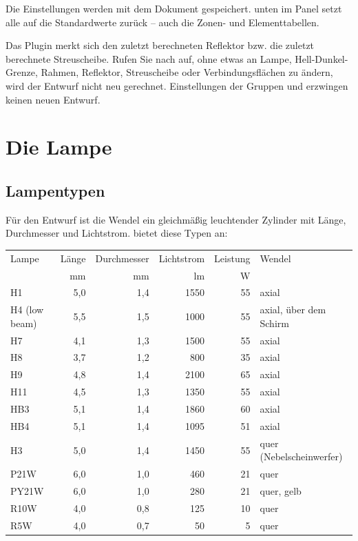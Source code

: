 Die Einstellungen werden mit dem Dokument gespeichert.  unten im Panel setzt
alle auf die Standardwerte zurück -- auch die Zonen- und Elementtabellen.

\begin{tipp}
Das Plugin merkt sich den zuletzt berechneten Reflektor bzw. die zuletzt berechnete Streuscheibe.
Rufen Sie nach   auf, ohne etwas an Lampe,
Hell-Dunkel-Grenze, Rahmen, Reflektor, Streuscheibe oder Verbindungsflächen zu ändern, wird der
Entwurf nicht neu gerechnet. Einstellungen der Gruppen  und 
erzwingen keinen neuen Entwurf.
\end{tipp}

\section{Die Lampe}\label{sec:al-lampe}

\subsection{Lampentypen}

Für den Entwurf ist die Wendel ein gleichmäßig leuchtender Zylinder mit Länge, Durchmesser und
Lichtstrom.  bietet diese Typen an:

\begin{center}
\small
\begin{tabular}{lrrrrl}
\toprule
Lampe & Länge & Durchmesser & Lichtstrom & Leistung & Wendel \\
 & mm & mm & lm & W & \\
\midrule
H1 & 5,0 & 1,4 & 1550 & 55 & axial \\
H4 (low beam) & 5,5 & 1,5 & 1000 & 55 & axial, über dem Schirm \\
H7 & 4,1 & 1,3 & 1500 & 55 & axial \\
H8 & 3,7 & 1,2 & 800 & 35 & axial \\
H9 & 4,8 & 1,4 & 2100 & 65 & axial \\
H11 & 4,5 & 1,3 & 1350 & 55 & axial \\
HB3 & 5,1 & 1,4 & 1860 & 60 & axial \\
HB4 & 5,1 & 1,4 & 1095 & 51 & axial \\
H3 & 5,0 & 1,4 & 1450 & 55 & quer (Nebelscheinwerfer) \\
P21W & 6,0 & 1,0 & 460 & 21 & quer \\
PY21W & 6,0 & 1,0 & 280 & 21 & quer, gelb \\
R10W & 4,0 & 0,8 & 125 & 10 & quer \\
R5W & 4,0 & 0,7 & 50 & 5 & quer \\
\bottomrule
\end{tabular}
\end{center}

